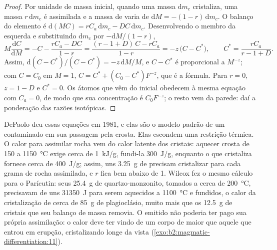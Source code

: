 \begin{proof}
Por unidade de massa inicial, quando uma massa $\mathrm dm_c$ cristaliza, uma massa
$r\,\mathrm dm_c$ é assimilada e a massa de  varia de $\mathrm dM =
-(1-r)\,\mathrm dm_c$. O balanço do elemento é $\mathrm d(MC) = rC_a\,\mathrm dm_c -
DC\,\mathrm dm_c$. Desenvolvendo o membro da esquerda e substituindo $\mathrm dm_c$ por
$-\mathrm dM/(1-r)$,
\[
M\frac{\mathrm dC}{\mathrm dM} = -C - \frac{rC_a - DC}{1-r}
= \frac{(r - 1 + D)\,C - rC_a}{1 - r} = -z\,\bigl(C - C^*\bigr),
\qquad C^* = \frac{rC_a}{r - 1 + D}.
\]
Assim, $\mathrm d(C - C^*)/(C - C^*) = -z\,\mathrm dM/M$, e $C - C^*$ é proporcional
a $M^{-z}$; com $C = C_0$ em $M = 1$, $C = C^* + (C_0 - C^*)F^{-z}$, que é a
fórmula. Para $r = 0$, $z = 1 - D$ e $C^* = 0$. Os átomos que vêm do
 inicial obedecem à mesma equação com $C_a = 0$, de modo que sua concentração é
$C_0F^{-z}$; o resto vem da parede: daí a ponderação das razões isotópicas.
\end{proof}

DePaolo deu essas equações em 1981, e elas são o modelo padrão de um 
contaminado em sua passagem pela crosta. Elas escondem uma restrição térmica. O calor
para assimilar rocha vem do calor latente dos cristais: aquecer crosta de
150 a \qty{1150}{\celsius} exige cerca de \qty{1}{kJ/g}, fundi-la \qty{300}{J/g},
enquanto o  que cristaliza fornece cerca de \qty{400}{J/g}; assim, uns \qty{3.25}{g} de
 precisam cristalizar para cada grama de rocha assimilada, e $r$ fica bem abaixo de 1.
Wilcox fez o mesmo cálculo para o Parícutin: seus \qty{25.4}{g} de quartzo-monzonito,
tomados a cerca de \qty{200}{\celsius}, precisavam de uns \qty{31350}{J} para serem
aquecidos a \qty{1100}{\celsius} e fundidos, o calor da cristalização de cerca de
\qty{85}{g} de plagioclásio, muito mais que os \qty{12.5}{g} de cristais que seu balanço
de massa removia. O  emitido não poderia ter pago sua própria assimilação:
o calor deve ter vindo de um corpo de  maior que aquele que entrou em erupção,
cristalizando longe da vista (\cref{exo:b2:magmatic-differentiation:11}).

